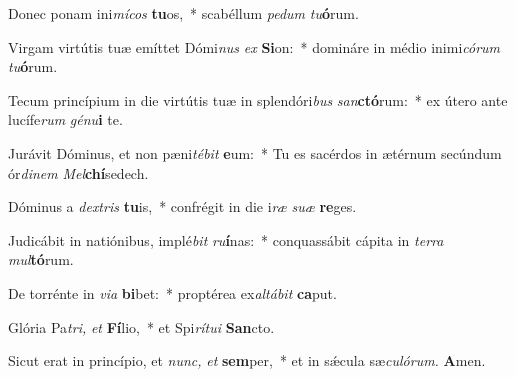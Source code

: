 \item Donec ponam ini\textit{mícos} \textbf{tu}os,~* scabéllum \textit{pedum} \textit{tu}\textbf{ó}rum.
\item Virgam virtútis tuæ emíttet Dómi\textit{nus} \textit{ex} \textbf{Si}on:~* domináre in médio inimi\tinyhspace\textit{córum} \textit{tu}\textbf{ó}rum.
\item Tecum princípium in die virtútis tuæ in splendóri\textit{bus} \textit{san}\textbf{ctó}rum:~* ex útero ante lucífe\textit{rum} \textit{génu}\textbf{i} te.
\item Jurávit Dóminus, et non pæni\tinyhspace\textit{tébit} \textbf{e}um:~* Tu es sacérdos in ætérnum secúndum ór\textit{dinem} \textit{Mel}\textbf{chí}sedech.
\item Dóminus a \textit{dextris} \textbf{tu}is,~* confrégit in die i\tinyhspace\textit{ræ} \textit{suæ} \textbf{re}ges.
\item Judicábit in natiónibus, implé\textit{bit} \textit{ru}\textbf{í}nas:~* conquassábit cápita in \textit{terra} \textit{mul}\textbf{tó}rum.
\item De torrénte in \textit{via} \textbf{bi}bet:~* proptérea ex\tinyhspace\textit{altábit} \textbf{ca}put.
\item Glória Pa\tinyhspace\textit{tri,} \textit{et} \textbf{Fí}lio,~* et Spi\tinyhspace\textit{rítui} \textbf{San}cto.
\item Sicut erat in princípio, et \textit{nunc,} \textit{et} \textbf{sem}per,~* et in sǽcula sæ\textit{culórum.} \textbf{A}men.
